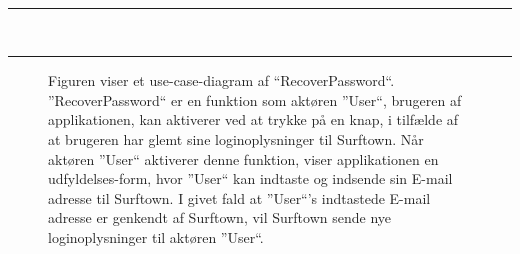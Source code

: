 \documentclass[12pt]{article}
\begin{document}
	\\
	\rule{430pt}{0.4pt}
	\\\rule{430pt}{0.4pt}
\vspace{-30pt}
\begin{figure}[!h]
	\caption{Figuren viser et use-case-diagram af ``RecoverPassword``. ''RecoverPassword`` er en funktion som aktøren  ''User``, brugeren af applikationen, kan aktiverer ved at trykke på en knap, i tilfælde af at brugeren har glemt sine loginoplysninger til Surftown. Når aktøren ''User`` aktiverer denne funktion, viser applikationen en udfyldelses-form, hvor ''User`` kan indtaste og indsende sin E-mail adresse til Surftown. I givet fald at ''User``'s indtastede E-mail adresse er genkendt af Surftown, vil Surftown sende nye loginoplysninger til aktøren ''User``.}
	\label{RecoverPasswordUseCase}
\end{figure}\\
\newpage
\end{document}
